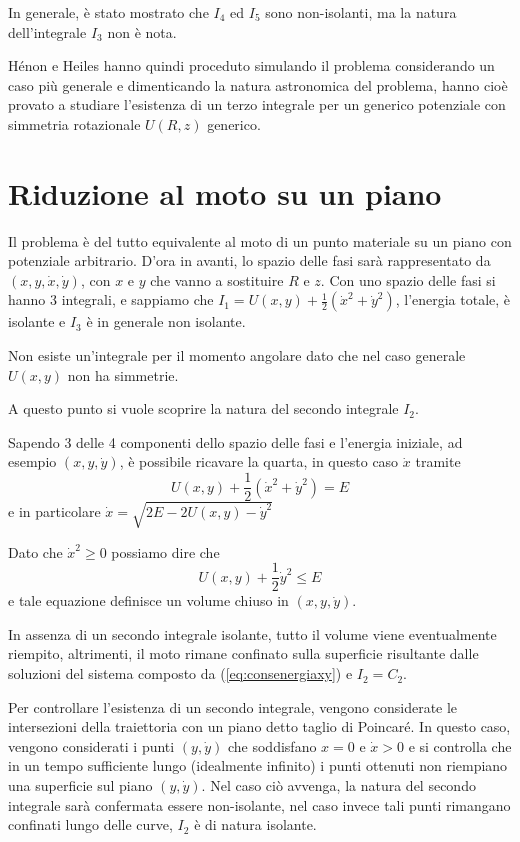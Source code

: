 \documentclass[a4paper]{article}
\numberwithin{equation}{section}
\numberwithin{figure}{section}
\begin{document}
In generale, è stato mostrato che $I_4$ ed $I_5$ sono non-isolanti, ma la natura dell'integrale
$I_3$ non è nota.

Hénon e Heiles hanno quindi proceduto simulando il problema considerando un caso più generale
e dimenticando la natura astronomica del problema, hanno cioè provato a studiare l'esistenza
di un terzo integrale per un generico potenziale con simmetria rotazionale $U(R,z)$ generico.

\clearpage
\section{Riduzione al moto su un piano}
Il problema è del tutto equivalente al moto di un punto materiale su un piano con potenziale
arbitrario. D'ora in avanti, lo spazio delle fasi sarà rappresentato da $(x,y,\dot{x},\dot{y})$,
con $x$ e $y$ che vanno a sostituire $R$ e $z$. Con uno spazio delle fasi si hanno 3 integrali,
e sappiamo che $I_1 = U(x,y)+\frac{1}{2}(\dot{x}^2+\dot{y}^2)$, l'energia totale, è isolante e $I_3$ è
in generale non isolante.

Non esiste un'integrale per il momento angolare dato che nel caso generale $U(x,y)$ non ha
simmetrie.

A questo punto si vuole scoprire la natura del secondo integrale $I_2$.

Sapendo 3 delle 4 componenti dello spazio delle fasi e l'energia iniziale, ad esempio $(x,y,\dot{y})$,
è possibile
ricavare la quarta, in questo caso $\dot{x}$ tramite
\begin{equation}
	U(x,y)+\frac{1}{2}(\dot{x}^2+\dot{y}^2) = E \label{eq:consenergiaxy}
\end{equation}
e in particolare $\dot{x} = \sqrt{2E-2U(x,y)-\dot{y}^2}$

Dato che $\dot{x}^2\ge0$ possiamo dire che
\begin{equation}
	U(x,y)+\frac{1}{2}\dot{y}^2 \le E
\end{equation}
e tale equazione definisce un volume chiuso in $(x,y,\dot{y})$.

In assenza di un secondo integrale isolante, tutto il volume viene eventualmente riempito,
altrimenti, il moto rimane confinato sulla superficie risultante dalle soluzioni del sistema
composto da (\ref{eq:consenergiaxy}) e $I_2 = C_2$.

Per controllare l'esistenza di un secondo integrale, vengono considerate le intersezioni della
traiettoria con un piano detto taglio di Poincaré. In questo caso, vengono considerati i punti
$(y,\dot{y})$ che soddisfano $x=0$ e $\dot{x}>0$ e si controlla che in un tempo sufficiente lungo
(idealmente infinito) i punti ottenuti non riempiano una superficie sul piano $(y,\dot{y})$. Nel
caso ciò avvenga, la natura del secondo integrale sarà confermata essere non-isolante, nel caso
invece tali punti rimangano confinati lungo delle curve, $I_2$ è di natura isolante.
\end{document}

